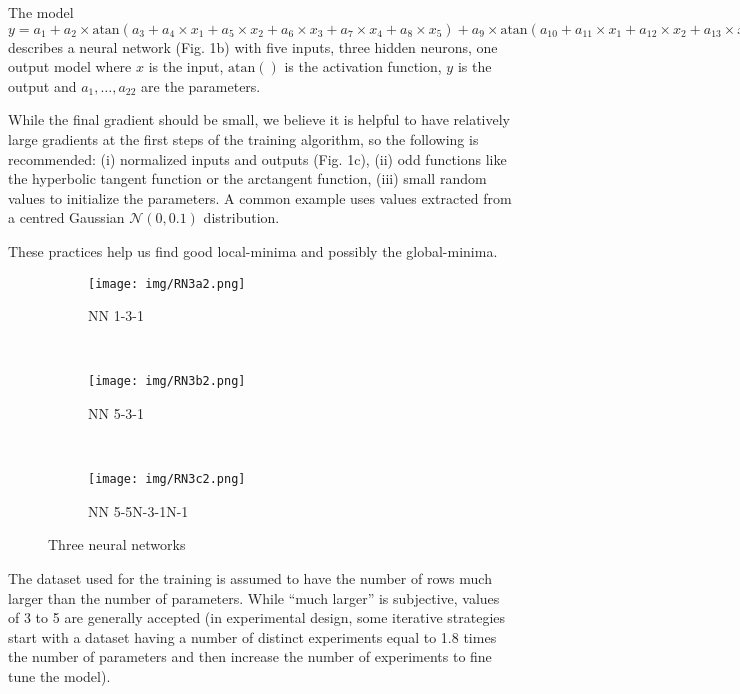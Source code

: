 The model
\(y = a_1 + a_2\times \text{atan}(a_3 + a_4\times x_1 + a_5\times x_2 + a_6\times x_3 + a_7\times x_4 + a_8\times x_5) + a_9\times \text{atan}(a_{10} + a_{11}\times x_1 + a_{12}\times x_2 + a_{13}\times x_3 + a_{14}\times x_4 + a_{15}\times x_5) + a_{16}\text{atan}(a_{17} + a_{18}\times x_1 + a_{19}\times x_2 + a_{20}\times x_3 + a_{21}\times x_4 + a_{22}\times x_5)\)
describes a neural network (Fig. 1b) with five inputs, three hidden
neurons, one output model where \(x\) is the input, \(\text{atan}()\) is
the activation function, \(y\) is the output and \(a_1,\dots,a_{22}\)
are the parameters.

While the final gradient should be small, we believe it is helpful to
have relatively large gradients at the first steps of the training
algorithm, so the following is recommended: (i) normalized inputs and
outputs (Fig. 1c), (ii) odd functions like the hyperbolic tangent
function or the arctangent function, (iii) small random values to
initialize the parameters. A common example uses values extracted from a
centred Gaussian \(\mathcal N(0, 0.1)\) distribution.

These practices help us find good local-minima and possibly the
global-minima.

\begin{figure}
    \centering
    \begin{subfigure}[b]{0.242\textwidth}
        \texttt{[image: img/RN3a2.png]}
        \caption{NN 1-3-1}
        \label{fig:N131}
    \end{subfigure}
    ~ 
    \begin{subfigure}[b]{0.250\textwidth}
        \texttt{[image: img/RN3b2.png]}
        \caption{NN 5-3-1}
        \label{fig:N531}
    \end{subfigure}
    ~ 
    \begin{subfigure}[b]{0.396\textwidth}
        \texttt{[image: img/RN3c2.png]}
        \caption{NN 5-5N-3-1N-1}
        \label{fig:N55311}
    \end{subfigure}
    \caption{Three neural networks}
\end{figure}

The dataset used for the training is assumed to have the number of rows
much larger than the number of parameters. While ``much larger'' is
subjective, values of 3 to 5 are generally accepted (in experimental
design, some iterative strategies start with a dataset having a number
of distinct experiments equal to 1.8 times the number of parameters and
then increase the number of experiments to fine tune the model).

